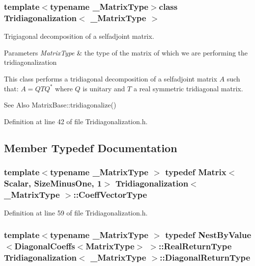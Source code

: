 \subsubsection*{template$<$typename \-\_\-\-Matrix\-Type$>$class Tridiagonalization$<$ \-\_\-\-Matrix\-Type $>$}

Trigiagonal decomposition of a selfadjoint matrix. 


\begin{DoxyParams}{Parameters}
{\em Matrix\-Type} & the type of the matrix of which we are performing the tridiagonalization\\
\hline
\end{DoxyParams}
This class performs a tridiagonal decomposition of a selfadjoint matrix $ A $ such that\-: $ A = Q T Q^* $ where $ Q $ is unitary and $ T $ a real symmetric tridiagonal matrix.

\begin{DoxySeeAlso}{See Also}
Matrix\-Base\-::tridiagonalize() 
\end{DoxySeeAlso}


Definition at line 42 of file Tridiagonalization.\-h.



\subsection{Member Typedef Documentation}
\hypertarget{class_tridiagonalization_aae368c68d55fd86aa74b45fe1124864d}{
\subsubsection[{Coeff\-Vector\-Type}]{\setlength{\rightskip}{0pt plus 5cm}template$<$typename \-\_\-\-Matrix\-Type $>$ typedef {\bf Matrix}$<${\bf Scalar}, {\bf Size\-Minus\-One}, 1$>$ {\bf Tridiagonalization}$<$ \-\_\-\-Matrix\-Type $>$\-::{\bf Coeff\-Vector\-Type}}}\label{class_tridiagonalization_aae368c68d55fd86aa74b45fe1124864d}


Definition at line 59 of file Tridiagonalization.\-h.

\hypertarget{class_tridiagonalization_a4641fd1d32be493cb55fe788e331c9c6}{
\subsubsection[{Diagonal\-Return\-Type}]{\setlength{\rightskip}{0pt plus 5cm}template$<$typename \-\_\-\-Matrix\-Type $>$ typedef {\bf Nest\-By\-Value}$<${\bf Diagonal\-Coeffs}$<${\bf Matrix\-Type}$>$ $>$\-::Real\-Return\-Type {\bf Tridiagonalization}$<$ \-\_\-\-Matrix\-Type $>$\-::{\bf Diagonal\-Return\-Type}}}\label{class_tridiagonalization_a4641fd1d32be493cb55fe788e331c9c6}


